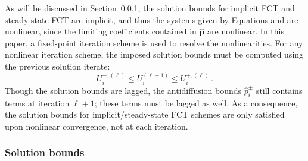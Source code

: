 \documentclass[xchauthor,chkrefs,fixeqskip,GCNS,amsmath,amsthm]{yjcphg}
\theoremstyle{remark}
\begin{document}
As will be discussed in Section~\ref{sec:solution_bounds}, the solution
bounds for implicit FCT and steady-state FCT are implicit, and thus the
systems given by Equations  and 
are nonlinear, since the limiting coefficients contained in
$\hat{\mathbf{p}}$ are nonlinear. In this paper, a fixed-point iteration
scheme is used to resolve the nonlinearities. For any nonlinear
iteration scheme, the imposed solution bounds must be computed using the
previous solution iterate:
%
\begin{equation}
U_{i}^{-,(\ell)} \leq U_{i}^{(\ell+1)} \leq U_{i}^{+,(\ell)} \,.
\end{equation}
%
Though the solution bounds are lagged, the antidiffusion bounds
$\hat{p}_{i}^{\pm}$ still contains terms at iteration $\ell+1$; these
terms must be lagged as well. As a consequence, the solution bounds for
implicit/steady-state FCT schemes are only satisfied upon nonlinear
convergence, not at each iteration.

\subsubsection{Solution bounds}%
\label{sec:solution_bounds}
\end{document}
